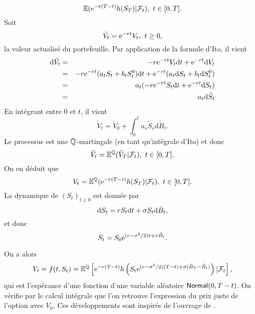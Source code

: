 $$
\mathbb{E}(\mathrm{e}^{-r(T-t)}h(S_T)|\mathcal{F}_t),\text{ }t\in [0,T].
$$
Soit 
$$
\tilde{V_t} = \mathrm{e}^{-rt}V_t,\text{ }t\geq 0,
$$
la valeur actualisé du portefeuille. Par application de la formule d'Ito, il vient 
\begin{eqnarray*}
\text{d}\tilde{V_t}  &=& -r\mathrm{e}^{-rt}V_t\text{d}t + \mathrm{e}^{-rt}\text{d}V_t\\
 &=&-r\mathrm{e}^{-rt}(a_t S_t + b_tS_t^0)\text{d}t + \mathrm{e}^{-rt}(a_t \text{d}S_t + b_t\text{d}S_t^0 )\\
 &=&a_t(-r\mathrm{e}^{-rt}S_t\text{d}t + \mathrm{e}^{-rt}\text{d}S_t)\\
 &=&a_t\text{d}\tilde{S}_t
\end{eqnarray*}
En intégrant entre $0$ et $t$, il vient
$$
\tilde{V}_t = \tilde{V}_0 + \int_0^ta_s\tilde{S}_s\text{d}\tilde{B}_t.
$$
Le processus est une $\mathbb{Q}$-martingale (en tant qu'intégrale d'Ito) et donc 
$$
\tilde{V}_t = \mathbb{E}^{\mathbb{Q}}(\tilde{V}_T|\mathcal{F}_t),\text{ }t\in [0,T].
$$
On en déduit que 
$$
V_t = \mathbb{E}^{\mathbb{Q}}(\mathrm{e}^{-r(T-t)}h(S_T)|\mathcal{F}_t),\text{ }t\in [0,T].
$$
La dynamique de $(S_t)_{t\geq 0}$ est donnée par 
$$
\text{d} S_t = r S_t\text{d} t + \sigma S_t\text{d}  \tilde{B}_t,
$$
et donc 
$$
S_t = S_0 \mathrm{e}^{(r-\sigma^2 / 2)t + \sigma \tilde{B}_t }.
$$

On a alors 
$$
V_t = f(t, S_t) = \mathbb{E}^{\mathbb{Q}}\left[\mathrm{e}^{-r(T-t)}h\left(S_t\mathrm{e}^{(r-\sigma^2 / 2)(T-t) + \sigma (\tilde{B}_T - \tilde{B}_t)}\right)|\mathcal{F}_t\right],
$$
qui est l'espérance d'une fonction d'une variable aléatoire $\mathsf{Normal}(0,T-t)$. On vérifie par le calcul intégrale que l'on retrouve l'expression du prix juste de l'option avec $V_0$. Ces développements sont inspirés de l'ouvrage de \citet{Mikosch1998}.

